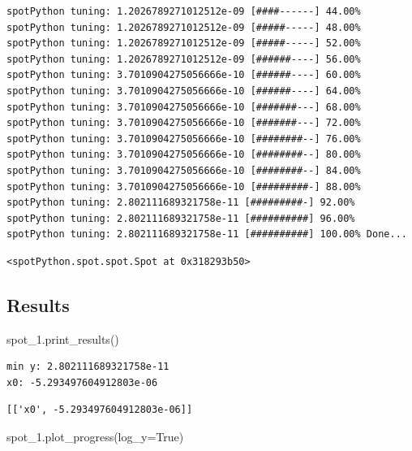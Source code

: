 \documentclass[
  letterpaper,
  DIV=11,
  numbers=noendperiod]{scrreprt}
\newenvironment{Shaded}{\begin{snugshade}}{\end{snugshade}}
\newcommand{\NormalTok}[1]{\textcolor[rgb]{0.00,0.23,0.31}{#1}}
\newcommand{\OperatorTok}[1]{\textcolor[rgb]{0.37,0.37,0.37}{#1}}
\newcommand{\VariableTok}[1]{\textcolor[rgb]{0.07,0.07,0.07}{#1}}
\begin{document}
\begin{verbatim}
spotPython tuning: 1.2026789271012512e-09 [####------] 44.00% 
spotPython tuning: 1.2026789271012512e-09 [#####-----] 48.00% 
spotPython tuning: 1.2026789271012512e-09 [#####-----] 52.00% 
spotPython tuning: 1.2026789271012512e-09 [######----] 56.00% 
spotPython tuning: 3.7010904275056666e-10 [######----] 60.00% 
spotPython tuning: 3.7010904275056666e-10 [######----] 64.00% 
spotPython tuning: 3.7010904275056666e-10 [#######---] 68.00% 
spotPython tuning: 3.7010904275056666e-10 [#######---] 72.00% 
spotPython tuning: 3.7010904275056666e-10 [########--] 76.00% 
spotPython tuning: 3.7010904275056666e-10 [########--] 80.00% 
spotPython tuning: 3.7010904275056666e-10 [########--] 84.00% 
spotPython tuning: 3.7010904275056666e-10 [#########-] 88.00% 
spotPython tuning: 2.802111689321758e-11 [#########-] 92.00% 
spotPython tuning: 2.802111689321758e-11 [##########] 96.00% 
spotPython tuning: 2.802111689321758e-11 [##########] 100.00% Done...
\end{verbatim}

\begin{verbatim}
<spotPython.spot.spot.Spot at 0x318293b50>
\end{verbatim}

\subsection{Results}\label{results-3}

\begin{Shaded}
\begin{Highlighting}[]
\NormalTok{spot\_1.print\_results()}
\end{Highlighting}
\end{Shaded}

\begin{verbatim}
min y: 2.802111689321758e-11
x0: -5.293497604912803e-06
\end{verbatim}

\begin{verbatim}
[['x0', -5.293497604912803e-06]]
\end{verbatim}

\begin{Shaded}
\begin{Highlighting}[]
\NormalTok{spot\_1.plot\_progress(log\_y}\OperatorTok{=}\VariableTok{True}\NormalTok{)}
\end{Highlighting}
\end{Shaded}
\end{document}

